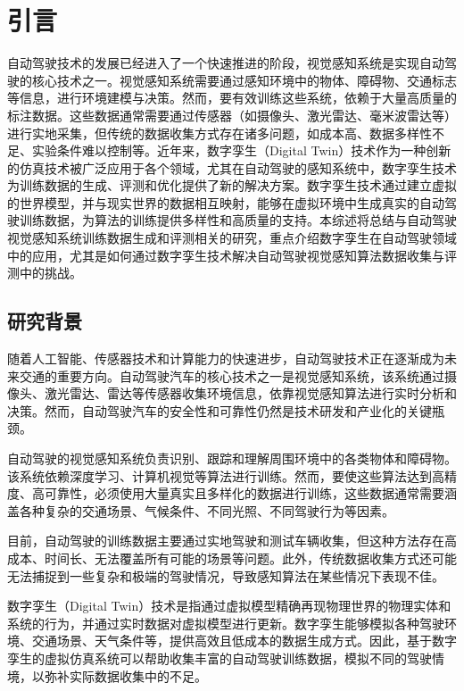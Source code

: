 \chapter{引言}

自动驾驶技术的发展已经进入了一个快速推进的阶段，视觉感知系统是实现自动驾驶的核心技术之一。视觉感知系统需要通过感知环境中的物体、障碍物、交通标志等信息，进行环境建模与决策。然而，要有效训练这些系统，依赖于大量高质量的标注数据。这些数据通常需要通过传感器（如摄像头、激光雷达、毫米波雷达等）进行实地采集，但传统的数据收集方式存在诸多问题，如成本高、数据多样性不足、实验条件难以控制等。近年来，数字孪生（Digital Twin）技术作为一种创新的仿真技术被广泛应用于各个领域，尤其在自动驾驶的感知系统中，数字孪生技术为训练数据的生成、评测和优化提供了新的解决方案。数字孪生技术通过建立虚拟的世界模型，并与现实世界的数据相互映射，能够在虚拟环境中生成真实的自动驾驶训练数据，为算法的训练提供多样性和高质量的支持。本综述将总结与自动驾驶视觉感知系统训练数据生成和评测相关的研究，重点介绍数字孪生在自动驾驶领域中的应用，尤其是如何通过数字孪生技术解决自动驾驶视觉感知算法数据收集与评测中的挑战。

\section{研究背景}


随着人工智能、传感器技术和计算能力的快速进步，自动驾驶技术正在逐渐成为未来交通的重要方向。自动驾驶汽车的核心技术之一是视觉感知系统，该系统通过摄像头、激光雷达、雷达等传感器收集环境信息，依靠视觉感知算法进行实时分析和决策。然而，自动驾驶汽车的安全性和可靠性仍然是技术研发和产业化的关键瓶颈。

自动驾驶的视觉感知系统负责识别、跟踪和理解周围环境中的各类物体和障碍物。该系统依赖深度学习、计算机视觉等算法进行训练。然而，要使这些算法达到高精度、高可靠性，必须使用大量真实且多样化的数据进行训练，这些数据通常需要涵盖各种复杂的交通场景、气候条件、不同光照、不同驾驶行为等因素。

目前，自动驾驶的训练数据主要通过实地驾驶和测试车辆收集，但这种方法存在高成本、时间长、无法覆盖所有可能的场景等问题。此外，传统数据收集方式还可能无法捕捉到一些复杂和极端的驾驶情况，导致感知算法在某些情况下表现不佳。

数字孪生（Digital Twin）技术是指通过虚拟模型精确再现物理世界的物理实体和系统的行为，并通过实时数据对虚拟模型进行更新。数字孪生能够模拟各种驾驶环境、交通场景、天气条件等，提供高效且低成本的数据生成方式。因此，基于数字孪生的虚拟仿真系统可以帮助收集丰富的自动驾驶训练数据，模拟不同的驾驶情境，以弥补实际数据收集中的不足。

